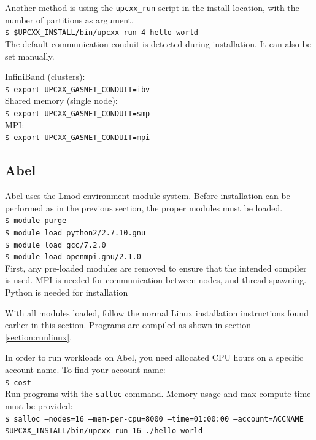 \documentclass{uit-report}
\begin{document}
Another method is using the \texttt{upcxx\_run} script in the install location, with the number of partitions as argument.\\
\phantom{11111} \texttt{\$ \$UPCXX\_INSTALL/bin/upcxx-run 4 hello-world}\\

The default communication conduit is detected during installation. It can also be set manually.

InfiniBand (clusters):\\
\phantom{11111} \texttt{\$ export UPCXX\_GASNET\_CONDUIT=ibv}\\
Shared memory (single node):\\
\phantom{11111} \texttt{\$ export UPCXX\_GASNET\_CONDUIT=smp}\\
MPI:\\
\phantom{11111} \texttt{\$ export UPCXX\_GASNET\_CONDUIT=mpi}\\
\subsection{Abel}
Abel uses the Lmod environment module system. Before installation can be performed as in the previous section, the proper modules must be loaded. \\
\phantom{11111} \texttt{\$ module purge}\\
\phantom{11111} \texttt{\$ module load python2/2.7.10.gnu}\\
\phantom{11111} \texttt{\$ module load gcc/7.2.0}\\
\phantom{11111} \texttt{\$ module load openmpi.gnu/2.1.0}  \\
First, any pre-loaded modules are removed to ensure that the intended compiler is used. MPI is needed for communication between nodes, and thread spawning. Python is needed for installation 

With all modules loaded, follow the normal Linux installation instructions found earlier in this section. Programs are compiled as shown in section \ref{section:runlinux}.

In order to run workloads on Abel, you need allocated CPU hours on a specific account name. To find your account name:\\
\phantom{11111} \texttt{\$ cost}\\
Run programs with the \texttt{salloc} command. Memory usage and max compute time must be provided:\\
\phantom{11111} \texttt{\$ salloc --nodes=16 --mem-per-cpu=8000 --time=01:00:00 --account=ACCNAME \$UPCXX\_INSTALL/bin/upcxx-run 16 ./hello-world}\\
\end{document}

